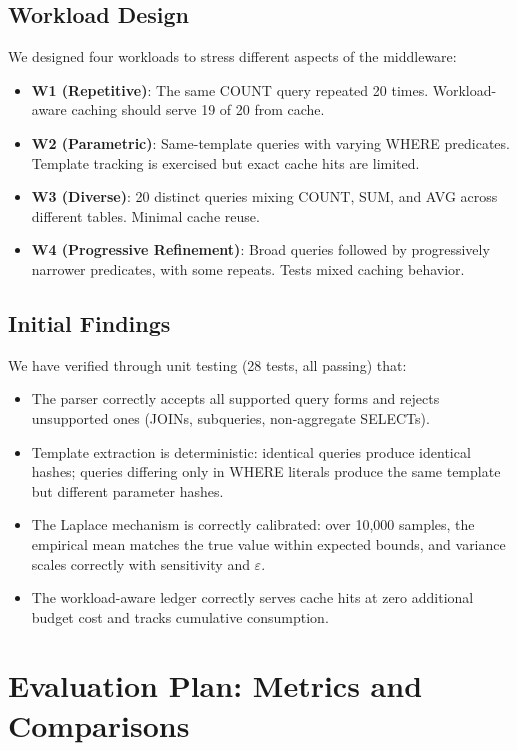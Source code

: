 \documentclass[sigconf,nonacm]{acmart}
\begin{document}
\subsection{Workload Design}

We designed four workloads to stress different aspects of the middleware:
\begin{itemize}
    \item \textbf{W1 (Repetitive)}: The same COUNT query repeated 20 times. Workload-aware caching should serve 19 of 20 from cache.
    \item \textbf{W2 (Parametric)}: Same-template queries with varying WHERE predicates. Template tracking is exercised but exact cache hits are limited.
    \item \textbf{W3 (Diverse)}: 20 distinct queries mixing COUNT, SUM, and AVG across different tables. Minimal cache reuse.
    \item \textbf{W4 (Progressive Refinement)}: Broad queries followed by progressively narrower predicates, with some repeats. Tests mixed caching behavior.
\end{itemize}

\subsection{Initial Findings}

We have verified through unit testing (28 tests, all passing) that:
\begin{itemize}
    \item The parser correctly accepts all supported query forms and rejects unsupported ones (JOINs, subqueries, non-aggregate SELECTs).
    \item Template extraction is deterministic: identical queries produce identical hashes; queries differing only in WHERE literals produce the same template but different parameter hashes.
    \item The Laplace mechanism is correctly calibrated: over 10,000 samples, the empirical mean matches the true value within expected bounds, and variance scales correctly with sensitivity and $\varepsilon$.
    \item The workload-aware ledger correctly serves cache hits at zero additional budget cost and tracks cumulative consumption.
\end{itemize}

\section{Evaluation Plan: Metrics and Comparisons}
\label{sec:metrics}
\end{document}

